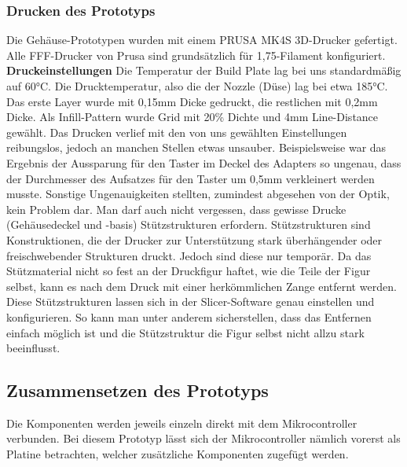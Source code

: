 \documentclass[11pt, twoside]{article}
\begin{document}
\subsubsection{Drucken des Prototyps}
Die Gehäuse-Prototypen wurden mit einem \glqq PRUSA MK4S\grqq{} 3D-Drucker gefertigt. Alle FFF-Drucker von Prusa sind grundsätzlich für 1,75-Filament konfiguriert.
\vspace{4mm}\newline
\textbf{Druckeinstellungen} \newline
Die Temperatur der Build Plate lag bei uns standardmäßig auf 60°C. Die Drucktemperatur, also die der Nozzle (Düse) lag bei etwa 185°C. \newline
Das erste Layer wurde mit 0,15mm Dicke gedruckt, die restlichen mit 0,2mm Dicke. \newline
Als Infill-Pattern wurde \glqq Grid\grqq{} mit 20\% Dichte und 4mm Line-Distance gewählt. \newline
Das Drucken verlief mit den von uns gewählten Einstellungen reibungslos, jedoch an manchen Stellen etwas unsauber. Beispielsweise war das Ergebnis der Aussparung für den Taster im Deckel des Adapters so ungenau, dass der Durchmesser des Aufsatzes für den Taster um 0,5mm verkleinert werden musste. Sonstige Ungenauigkeiten stellten, zumindest abgesehen von der Optik, kein Problem dar. \newline
Man darf auch nicht vergessen, dass gewisse Drucke (Gehäusedeckel und -basis) Stützstrukturen erfordern. Stützstrukturen sind Konstruktionen, die der Drucker zur Unterstützung stark überhängender oder freischwebender Strukturen druckt. Jedoch sind diese nur temporär. Da das Stützmaterial nicht so fest an der Druckfigur haftet, wie die Teile der Figur selbst, kann es nach dem Druck mit einer herkömmlichen Zange entfernt werden. Diese Stützstrukturen lassen sich in der Slicer-Software genau einstellen und konfigurieren. So kann man unter anderem sicherstellen, dass das Entfernen einfach möglich ist und die Stützstruktur die Figur selbst nicht allzu stark beeinflusst.
\vspace{4mm}\newline
\parencite[vgl.][]{noauthor_urlnl16_nodate}
\subsection{Zusammensetzen des Prototyps}
Die Komponenten werden jeweils einzeln direkt mit dem Mikrocontroller verbunden. Bei diesem Prototyp lässt sich der Mikrocontroller nämlich vorerst als Platine betrachten, welcher zusätzliche Komponenten zugefügt werden.
\end{document}

